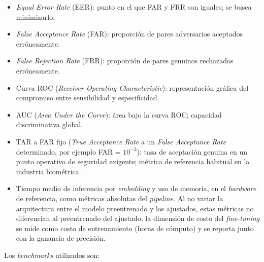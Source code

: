 \documentclass[
  11pt, %
]{charter}
\begin{document}
\begin{itemize}
  \item \textit{Equal Error Rate} (EER): punto en el que FAR y FRR son iguales; se busca minimizarlo.
  \item \textit{False Acceptance Rate} (FAR): proporción de pares adversarios aceptados erróneamente.
  \item \textit{False Rejection Rate} (FRR): proporción de pares genuinos rechazados erróneamente.
  \item Curva ROC (\textit{Receiver Operating Characteristic}): representación gráfica del compromiso entre sensibilidad y especificidad.
  \item AUC (\textit{Area Under the Curve}): área bajo la curva ROC; capacidad discriminativa global.
  \item TAR a FAR fijo (\textit{True Acceptance Rate} a un \textit{False Acceptance Rate} determinado, por ejemplo FAR = $10^{-3}$): tasa de aceptación genuina en un punto operativo de seguridad exigente; métrica de referencia habitual en la industria biométrica.
  \item Tiempo medio de inferencia por \textit{embedding} y uso de memoria, en el \textit{hardware} de referencia, como métricas absolutas del \textit{pipeline}. Al no variar la arquitectura entre el modelo preentrenado y los ajustados, estas métricas no diferencian al preentrenado del ajustado; la dimensión de costo del \textit{fine-tuning} se mide como costo de entrenamiento (horas de cómputo) y se reporta junto con la ganancia de precisión.
\end{itemize}

Los \textit{benchmarks} utilizados son:
\end{document}
